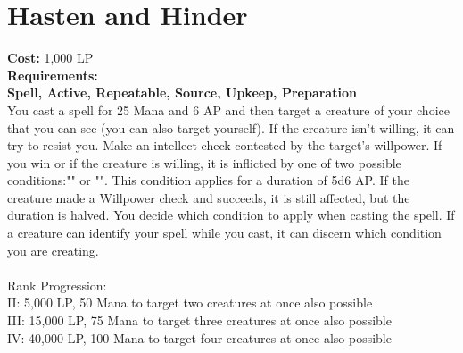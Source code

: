 \section{Hasten and Hinder}\label{spell:hastenHinder}
\textbf{Cost:} 1,000 LP\\
\textbf{Requirements:}\\
\textbf{Spell, Active, Repeatable, Source, Upkeep, Preparation}\\
You cast a spell for 25 Mana and 6 AP and then target a creature of your choice that you can see (you can also target yourself).
If the creature isn't willing, it can try to resist you.
Make an intellect check contested by the target's willpower.
If you win or if the creature is willing, it is inflicted by one of two possible conditions:"" or "".
This condition applies for a duration of 5d6 AP.
If the creature made a Willpower check and succeeds, it is still affected, but the duration is halved.
You decide which condition to apply when casting the spell.
If a creature can identify your spell while you cast, it can discern which condition you are creating.\\
\\
Rank Progression:\\
II: 5,000 LP, 50 Mana to target two creatures at once also possible\\
III: 15,000 LP, 75 Mana to target three creatures at once also possible\\
IV: 40,000 LP, 100 Mana to target four creatures at once also possible \\